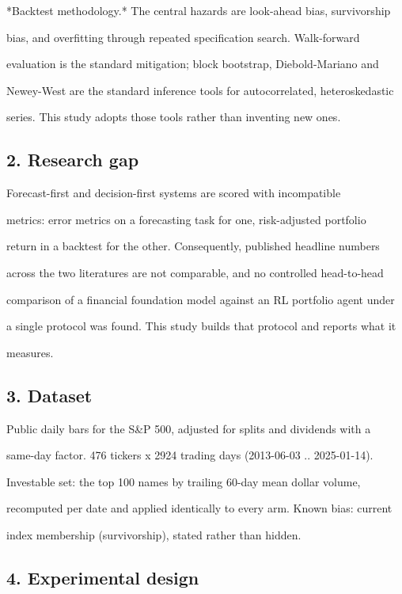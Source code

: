 *Backtest methodology.* The central hazards are look-ahead bias, survivorship\par
bias, and overfitting through repeated specification search. Walk-forward\par
evaluation is the standard mitigation; block bootstrap, Diebold-Mariano and\par
Newey-West are the standard inference tools for autocorrelated, heteroskedastic\par
series. This study adopts those tools rather than inventing new ones.\par

\subsection*{2. Research gap}

Forecast-first and decision-first systems are scored with incompatible\par
metrics: error metrics on a forecasting task for one, risk-adjusted portfolio\par
return in a backtest for the other. Consequently, published headline numbers\par
across the two literatures are not comparable, and no controlled head-to-head\par
comparison of a financial foundation model against an RL portfolio agent under\par
a single protocol was found. This study builds that protocol and reports what it\par
measures.\par

\subsection*{3. Dataset}

Public daily bars for the S\&P 500, adjusted for splits and dividends with a\par
same-day factor. 476 tickers x 2924 trading days (2013-06-03 .. 2025-01-14).\par
Investable set: the top 100 names by trailing 60-day mean dollar volume,\par
recomputed per date and applied identically to every arm. Known bias: current\par
index membership (survivorship), stated rather than hidden.\par

\subsection*{4. Experimental design}

